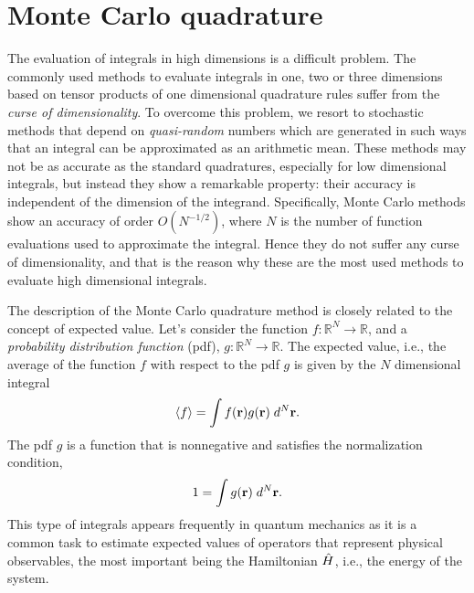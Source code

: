 \section{Monte Carlo quadrature}

The evaluation of integrals in high dimensions is a difficult problem. The
commonly used methods to evaluate integrals in one, two or three dimensions
based on tensor products of one dimensional quadrature rules suffer from the
\emph{curse of dimensionality}. To overcome this problem, we resort to
stochastic methods that depend on \emph{quasi-random} numbers which are
generated in such ways that an integral can be approximated as an arithmetic
mean. These methods may not be as accurate as the standard quadratures,
especially for low dimensional integrals, but instead they show a remarkable
property: their accuracy is independent of the dimension of the integrand.
Specifically, Monte Carlo methods show an accuracy of order $O(N^{-1/2})$, where
$N$ is the number of function evaluations used to approximate the integral.
Hence they do not suffer any curse of dimensionality, and that is the reason why
these are the most used methods to evaluate high dimensional integrals.

%

The description of the Monte Carlo quadrature method is closely related to the
concept of expected value. Let's consider the function $f: \mathbb{R}^N
  \rightarrow \mathbb{R}$, and a \emph{probability distribution function} (pdf),
$g: \mathbb{R}^N \rightarrow \mathbb{R}$. The expected value, i.e., the average
of the function $f$ with respect to the pdf $g$ is given by the $N$ dimensional
integral
%
\begin{equation}
  \label{eq:expected-value-def}
  \langle f \rangle = \int f(\mathbf r) g(\mathbf r) \; d^N \mathbf{r}.
\end{equation}
%
The pdf $g$ is a function that is nonnegative and satisfies the normalization
condition,
%
\begin{equation}
  1 = \int g(\mathbf r) \; d^N \mathbf{r}.
\end{equation}
%
This type of integrals appears frequently in quantum mechanics as it is a common
task to estimate expected values of operators that represent physical
observables, the most important being the Hamiltonian ${\hat{H}}$, i.e., the
energy of the system.

